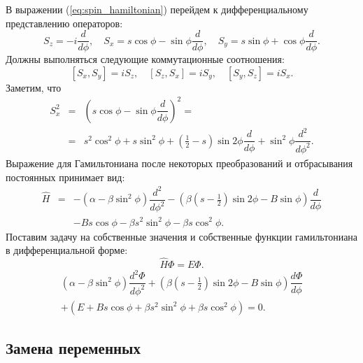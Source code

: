 \documentclass[12pt]{article}
\begin{document}
В выражении (\ref{eq:spin_hamiltonian}) перейдем к дифференциальному представлению операторов:
%
\begin{equation}
S_z = -i \dfrac{d}{d \phi}, \quad S_x = s \cos \phi - \sin \phi \dfrac{d}{d \phi}, \quad S_y = s \sin \phi + \cos \phi \dfrac{d}{d \phi}.
\label{eq:diff_repr}
\end{equation}
%
Должны выполняться следующие коммутационные соотношения:
%
$$[S_x, S_y] = iS_z, \quad [S_z, S_x] = iS_y, \quad [S_y, S_z] = iS_x.$$
%
Заметим, что
%
\begin{equation}
\begin{array}{lcl}
	S_x^2 & = & (s \cos \phi - \sin \phi \dfrac{d}{d \phi})^2 = \\
	& = & s^2 \cos^2 \phi + s \sin^2 \phi + (\frac{1}{2} - s) \sin 2 \phi \dfrac{d}{d \phi} + \sin^2 \phi \dfrac{d^2}{d \phi^2}.
\end{array}
\end{equation}
%
Выражение для Гамильтониана после некоторых преобразований и отбрасывания постоянных принимает вид:
%
\begin{equation*}
\begin{array}{lcl}
	\hat{H} & = & -(\alpha - \beta \sin^2 \phi) \dfrac{d^2}{d \phi^2} - (\beta (s - \frac{1}{2}) \sin 2 \phi - B \sin \phi) \dfrac{d}{d \phi} \\[10pt]
	&& - B s \cos \phi - \beta s^2 \sin^2 \phi - \beta s \cos^2 \phi.
\end{array}
\end{equation*}
%
Поставим задачу на собственные значения и собственные функции гамильтониана в дифференциальной форме:
%
\begin{equation}
\hat{H} \Phi = E \Phi.
\end{equation}
%
\begin{equation}
\begin{array}{l}
	(\alpha - \beta \sin^2 \phi) \dfrac{d^2 \Phi}{d \phi^2} + (\beta (s - \frac{1}{2}) \sin 2\phi - B \sin \phi) \dfrac{d \Phi}{d \phi} \\[10pt]
	+ (E + B s \cos \phi + \beta s^2 \sin^2 \phi + \beta s \cos^2 \phi) = 0.
\end{array}
\end{equation}

\subsection*{Замена переменных}
\end{document}
